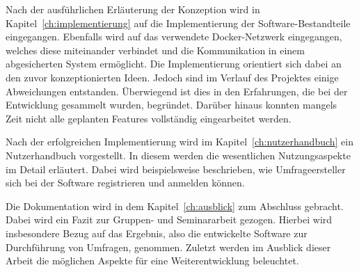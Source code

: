 Nach der ausführlichen Erläuterung der Konzeption wird in Kapitel~\vref{ch:implementierung} auf die Implementierung der Software-Bestandteile eingegangen. 
Ebenfalls wird auf das verwendete Docker-Netzwerk eingegangen, welches diese miteinander verbindet und die Kommunikation in einem abgesicherten System ermöglicht.
Die Implementierung orientiert sich dabei an den zuvor konzeptionierten Ideen.
Jedoch sind im Verlauf des Projektes einige Abweichungen entstanden.
Überwiegend ist dies in den Erfahrungen, die bei der Entwicklung gesammelt wurden, begründet.
Darüber hinaus konnten mangels Zeit nicht alle geplanten Features vollständig eingearbeitet werden.

Nach der erfolgreichen Implementierung wird im Kapitel~\vref{ch:nutzerhandbuch} ein Nutzerhandbuch vorgestellt. 
In diesem werden die wesentlichen Nutzungsaspekte im Detail erläutert.
Dabei wird beispielsweise beschrieben, wie Umfrageersteller sich bei der Software registrieren und anmelden können.

Die Dokumentation wird in dem Kapitel~\vref{ch:ausblick} zum Abschluss gebracht. 
Dabei wird ein Fazit zur Gruppen- und Seminararbeit gezogen.
Hierbei wird insbesondere Bezug auf das Ergebnis, also die entwickelte Software zur Durchführung von Umfragen, genommen.
Zuletzt werden im Ausblick dieser Arbeit die möglichen Aspekte für eine Weiterentwicklung beleuchtet.
